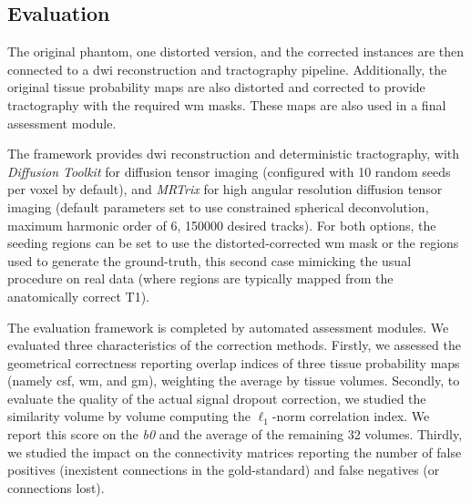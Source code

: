 \subsection{Evaluation}
\label{sec:evaluation}
The original phantom, one distorted version, and
the corrected instances are then connected to a
\gls*{dwi} reconstruction and tractography pipeline.
Additionally, the original tissue probability maps
are also distorted and corrected to provide tractography
with the required \gls*{wm} masks.
These maps are also used in a final assessment module.

The framework provides \gls*{dwi} reconstruction and
deterministic tractography,
with \emph{Diffusion Toolkit} \cite{wang_diffusion_2007}
for diffusion tensor imaging (configured with 10 random
seeds per voxel by default), and \emph{MRTrix}
\cite{tournier_mrtrix:_2012} for high angular resolution
diffusion tensor imaging (default parameters set to use
constrained spherical deconvolution, maximum harmonic
order of 6, 150000 desired tracks).
For both options, the seeding regions can be set to use
the distorted-corrected \gls*{wm} mask or the regions used
to generate the ground-truth, this second case mimicking
the usual procedure on real data (where regions are 
typically mapped from the anatomically correct T1).

The evaluation framework is completed by automated 
assessment modules. We evaluated three characteristics
of the correction methods. 
Firstly, we assessed the geometrical correctness
reporting overlap indices of three tissue
probability maps (namely \gls*{csf}, \gls*{wm},
and \gls*{gm}), weighting the average by tissue
volumes.
Secondly, to evaluate the quality of the actual 
signal dropout correction, we studied the 
similarity volume by volume computing the $\ell_1$-norm
correlation index. We report this score
on the \textit{b0} and the average of the remaining 32 
volumes. Thirdly, we studied the impact on the
connectivity matrices reporting the number of
false positives (inexistent connections in the
gold-standard) and false negatives (or connections
lost).
